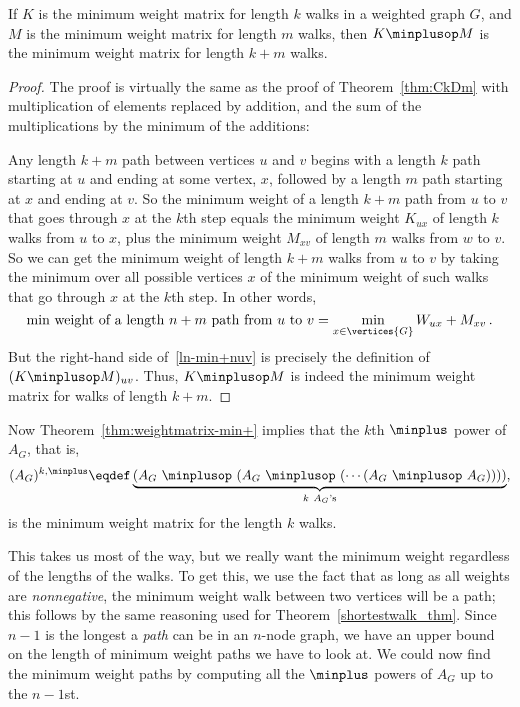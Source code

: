 \begin{theorem}\label{thm:weightmatrix-min+}
  If $K$ is the minimum weight matrix for length $k$ walks in a
  weighted graph $G$, and $M$ is the minimum weight matrix for length
  $m$ walks, then $K \minplusop M$ is the minimum weight matrix for
  length $k+m$ walks.
\end{theorem}

\begin{proof}
  The proof is virtually the same as the proof of Theorem~\ref{thm:CkDm}
  with multiplication of elements replaced by addition, and the sum of the
  multiplications by the minimum of the additions:

  Any length $k+m$ path between vertices $u$ and $v$ begins with a length
  $k$ path starting at $u$ and ending at some vertex, $x$, followed by a
  length $m$ path starting at $x$ and ending at $v$.  So the minimum
  weight of a length $k+m$ path from $u$ to $v$ that goes through $x$ at
  the $k$th step equals the minimum weight $K_{ux}$ of length $k$ walks
  from $u$ to $x$, plus the minimum weight $M_{xv}$ of length $m$ walks
  from $w$ to $v$.  So we can get the minimum weight of length $k+m$ walks
  from $u$ to $v$ by taking the minimum over all possible vertices $x$ of
  the minimum weight of such walks that go through $x$ at the $k$th step.
  In other words,
\begin{equation}\label{ln-min+nuv}
\text{min weight of a length $n+m$ path from $u$ to $v$} =
              \min_{x \in \vertices{G}} W_{ux}+M_{xv}\, .
\end{equation}
But the right-hand side of~\eqref{ln-min+nuv} is precisely the
definition of $(K \minplusop M)_{uv}$.  Thus, $K \minplusop M$ is
indeed the minimum weight matrix for walks of length $k+m$.
\end{proof}

Now Theorem~\ref{thm:weightmatrix-min+} implies that the $k$th $\minplus$ power
of $A_G$, that is,
\[
(A_G)^{k, \minplus} \eqdef \underbrace{(A_G\ \minplusop\ (A_G\
      \minplusop\ (\cdots (A_G\ \minplusop\ A_G)) ))}_{k\ A_G\text{'s}},
\]
is the minimum weight matrix for the length $k$ walks.

This takes us most of the way, but we really want the minimum weight
regardless of the lengths of the walks.  To get this, we use the fact
that as long as all weights are \emph{nonnegative}, the minimum weight
walk between two vertices will be a path; this follows by the same
reasoning used for Theorem~\ref{shortestwalk_thm}.  Since $n-1$ is the
longest a \emph{path} can be in an $n$-node graph, we have an upper
bound on the length of minimum weight paths we have to look at.  We
could now find the minimum weight paths by computing all the
$\minplus$ powers of $A_G$ up to the $n-1$st.

